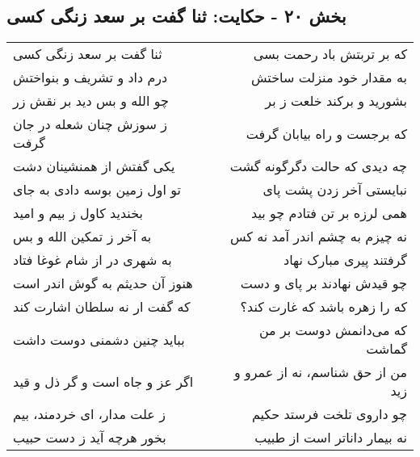 \begin{center}
\section*{بخش ۲۰ - حکایت: ثنا گفت بر سعد زنگی کسی}
\label{sec:020}
\begin{longtable}{l p{0.5cm} r}
ثنا گفت بر سعد زنگی کسی
&&
که بر تربتش باد رحمت بسی
\\
درم داد و تشریف و بنواختش
&&
به مقدار خود منزلت ساختش
\\
چو الله و بس دید بر نقش زر
&&
بشورید و برکند خلعت ز بر
\\
ز سوزش چنان شعله در جان گرفت
&&
که برجست و راه بیابان گرفت
\\
یکی گفتش از همنشینان دشت
&&
چه دیدی که حالت دگرگونه گشت
\\
تو اول زمین بوسه دادی به جای
&&
نبایستی آخر زدن پشت پای
\\
بخندید کاول ز بیم و امید
&&
همی لرزه بر تن فتادم چو بید
\\
به آخر ز تمکین الله و بس
&&
نه چیزم به چشم اندر آمد نه کس
\\
به شهری در از شام غوغا فتاد
&&
گرفتند پیری مبارک نهاد
\\
هنوز آن حدیثم به گوش اندر است
&&
چو قیدش نهادند بر پای و دست
\\
که گفت ار نه سلطان اشارت کند
&&
که را زهره باشد که غارت کند؟
\\
بباید چنین دشمنی دوست داشت
&&
که می‌دانمش دوست بر من گماشت
\\
اگر عز و جاه است و گر ذل و قید
&&
من از حق شناسم، نه از عمرو و زید
\\
ز علت مدار، ای خردمند، بیم
&&
چو داروی تلخت فرستد حکیم
\\
بخور هرچه آید ز دست حبیب
&&
نه بیمار داناتر است از طبیب
\\
\end{longtable}
\end{center}
